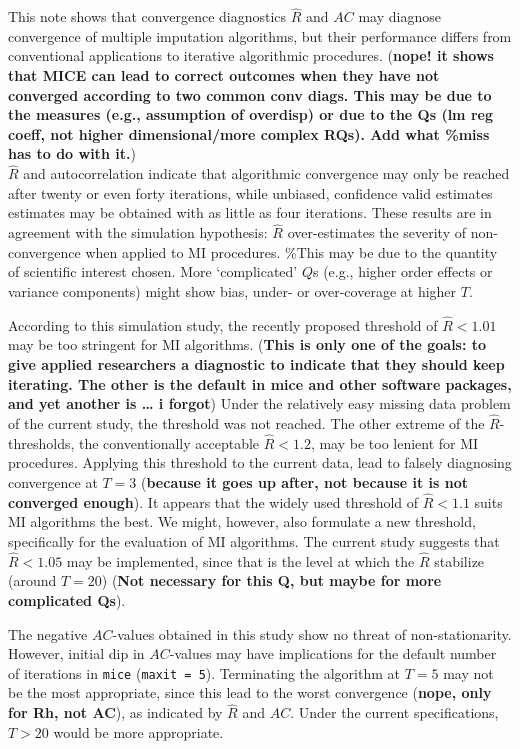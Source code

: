 \documentclass[Royal,times,sageh]{sagej}
\begin{document}
This note shows that convergence diagnostics \(\widehat{R}\) and \(AC\)
may diagnose convergence of multiple imputation algorithms, but their
performance differs from conventional applications to iterative
algorithmic procedures. (\textbf{nope! it shows that MICE can lead to
correct outcomes when they have not converged according to two common
conv diags. This may be due to the measures (e.g., assumption of
overdisp) or due to the Qs (lm reg coeff, not higher dimensional/more
complex RQs). Add what \%miss has to do with it.})\\
\(\widehat{R}\) and autocorrelation indicate that algorithmic
convergence may only be reached after twenty or even forty iterations,
while unbiased, confidence valid estimates estimates may be obtained
with as little as four iterations. These results are in agreement with
the simulation hypothesis: \(\widehat{R}\) over-estimates the severity
of non-convergence when applied to MI procedures. \%This may be due to
the quantity of scientific interest chosen. More `complicated' \(Q\)s
(e.g., higher order effects or variance components) might show bias,
under- or over-coverage at higher \(T\).

According to this simulation study, the recently proposed threshold of
\(\widehat{R}<1.01\) may be too stringent for MI algorithms.
(\textbf{This is only one of the goals: to give applied researchers a
diagnostic to indicate that they should keep iterating. The other is the
default in mice and other software packages, and yet another is \ldots{}
i forgot}) Under the relatively easy missing data problem of the current
study, the threshold was not reached. The other extreme of the
\(\widehat{R}\)-thresholds, the conventionally acceptable
\(\widehat{R} <1.2\), may be too lenient for MI procedures. Applying
this threshold to the current data, lead to falsely diagnosing
convergence at \(T = 3\) (\textbf{because it goes up after, not because
it is not converged enough}). It appears that the widely used threshold
of \(\widehat{R} < 1.1\) suits MI algorithms the best. We might,
however, also formulate a new threshold, specifically for the evaluation
of MI algorithms. The current study suggests that \(\widehat{R} < 1.05\)
may be implemented, since that is the level at which the \(\widehat{R}\)
stabilize (around \(T = 20\)) (\textbf{Not necessary for this Q, but
maybe for more complicated Qs}).

The negative \(AC\)-values obtained in this study show no threat of
non-stationarity. However, initial dip in \(AC\)-values may have
implications for the default number of iterations in \texttt{mice}
(\texttt{maxit\ =\ 5}). Terminating the algorithm at \(T=5\) may not be
the most appropriate, since this lead to the worst convergence
(\textbf{nope, only for Rh, not AC}), as indicated by \(\widehat{R}\)
and \(AC\). Under the current specifications, \(T>20\) would be more
appropriate.
\end{document}
